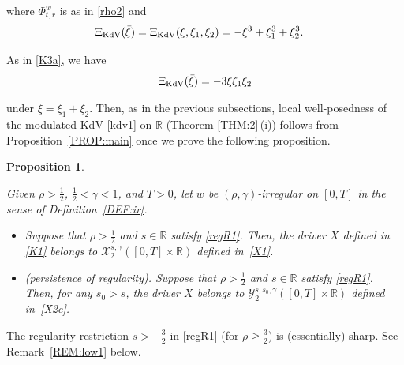 \documentclass[letterpaper, 11pt,  reqno]{amsart}
\newtheorem{proposition}[theorem]{Proposition}
\newcommand{\1}{\hspace{0.5mm}\text{I}\hspace{0.5mm}}
\newcommand{\noi}{\noindent}
\newcommand{\R}{\mathbb{R}}
\newcommand{\g}{\gamma}
\newcommand{\cX}{\mathcal{X}}
\newcommand{\cY}{\mathcal{Y}}
\newcommand{\KDV}{\text{\rm KdV} }
\numberwithin{equation}{section}
\numberwithin{theorem}{section}
\begin{document}
\noi
where $\Phi^w_{t,r}$ is as in \eqref{rho2}
and 
\begin{align*}
\Xi_\KDV (\bar \xi) &  = \Xi_\KDV (\xi,\xi_1,\xi_2) 
= - \xi^3+ \xi_1^3 +\xi_2^3.
\end{align*}

\noi
As in \eqref{K3a}, 
 we have
\begin{align}
\Xi_\KDV (\bar \xi) = - 3\xi \xi_1 \xi_2
\label{KR1b}
\end{align}

\noi
 under $\xi = \xi_1+ \xi_2$.
Then, as in the previous subsections, 
local well-posedness of the modulated KdV \eqref{kdv1}
on $\R$
(Theorem \ref{THM:2}\,(i)) follows
from Proposition~\ref{PROP:main}
once we prove
the following proposition.



\begin{proposition}
\label{PROP:KR1}


Given $\rho > \frac 12$,  $\frac 12 < \g < 1$, and $T> 0$, 
let  $w$ be $(\rho,\g)$-irregular on $[0, T]$ in the sense of Definition~\ref{DEF:ir}.

\smallskip

\begin{itemize}
\item[(i)]
Suppose that $\rho >  \frac 12$ and $s \in \R$
satisfy 
\eqref{regR1}.
Then, 
the driver $X$ defined in \eqref{K1}
belongs to $ \cX^{s, \g}_2([0, T]\times \R)$
defined in~\eqref{X1}.

\smallskip
\item[(ii)] \textup{(persistence of regularity).}
Suppose that $\rho >  \frac 12$ and $s \in \R$
satisfy 
\eqref{regR1}.
Then, 
for any $s_0 > s$, 
the driver $X$ 
belongs to 
$\cY^{s, s_0, \g}_{2}([0, T]\times \R)$
defined in~\eqref{X2c}.




\end{itemize}






\end{proposition}


The regularity restriction $s > - \frac 32$ in \eqref{regR1}
(for $\rho \ge \frac 32$) is (essentially) sharp.
See Remark~\ref{REM:low1} below.
\end{document}
